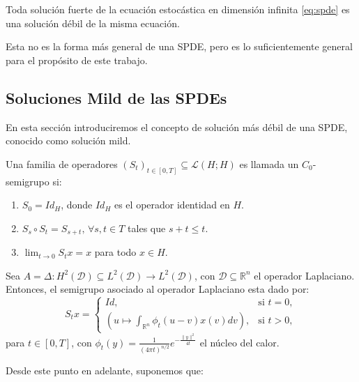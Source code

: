 \begin{prop}[]
  Toda solución fuerte de la ecuación estocástica en dimensión infinita \eqref{eq:spde} es una solución débil de la misma ecuación.
\end{prop}

\begin{obs}[]
  Esta no es la forma más general de una SPDE, pero es lo suficientemente general para el propósito de este trabajo.
\end{obs}

\subsection{Soluciones Mild de las SPDEs}

En esta sección introduciremos el concepto de solución más débil de una SPDE, conocido como solución mild.

\begin{defn}[$C_0$-Semigrupo]
  Una familia de operadores $(S_t)_{t \in [0,T]} \subseteq \mathcal{L}(H;H)$ es llamada un $C_0$-semigrupo si:
  \begin{enumerate}
    \item $S_0 = Id_H$, donde $Id_H$ es el operador identidad en $H$.
    \item $S_s \circ S_t = S_{s + t},\, \forall s, t \in T$ tales que $s + t \leq t$.
    \item $\lim_{t \to 0} S_t x = x$ para todo $x \in H$.
  \end{enumerate}
\end{defn}

\begin{ej}
  Sea $A = \Delta: H^2(\mathcal{D}) \subseteq L^2(\mathcal{D}) \rightarrow L^2(\mathcal{D})$, con $\mathcal{D} \subseteq \mathbb{R}^{n}$ el operador Laplaciano. Entonces, el semigrupo asociado al operador Laplaciano esta dado por:
  \[
    S_t x =
    \begin{cases}
      Id, & \text{si } t = 0,\\
      (u \mapsto \int_{\mathbb{R}^{n}} \phi_t(u - v)x(v) dv), & \text{si } t > 0,
    \end{cases}
  \]
  para $t \in [0, T]$, con $\phi_t(y) = \frac{1}{(4\pi t)^{n/2}} e^{-\frac{\|y\|^2}{4t}}$ el núcleo del calor.
\end{ej}

Desde este punto en adelante, suponemos que:

